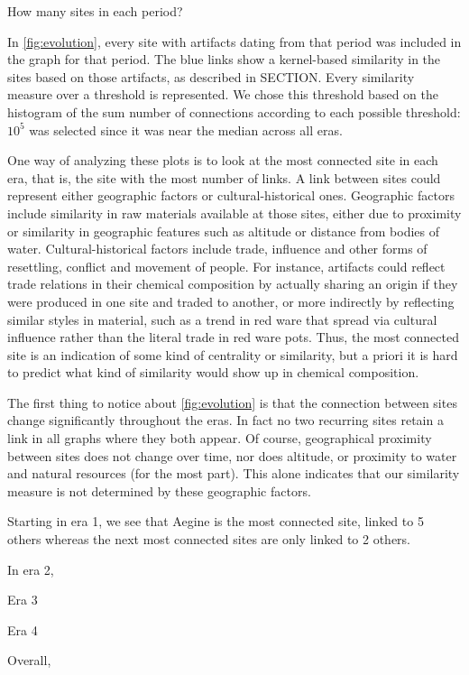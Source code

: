   How many sites in each period?
  
In \cref{fig:evolution}, every site with artifacts dating from that period was included in the graph for that period. The blue links show a kernel-based similarity in the sites based on those artifacts, as described in SECTION. Every similarity measure over a threshold is represented. We chose this threshold based on the histogram of the sum number of connections according to each possible threshold: $10^{5}$ was selected since it was near the median across all eras.

One way of analyzing these plots is to look at the most connected site in each era, that is, the site with the most number of links. A link between sites could represent either geographic factors or cultural-historical ones. Geographic factors include similarity in raw materials available at those sites, either due to proximity or similarity in geographic features such as altitude or distance from bodies of water. Cultural-historical factors include trade, influence and other forms of resettling, conflict and movement of people. For instance, artifacts could reflect trade relations in their chemical composition by actually sharing an origin if they were produced in one site and traded to another, or more indirectly by reflecting similar styles in material, such as a trend in red ware that spread via cultural influence rather than the literal trade in red ware pots.  Thus, the most connected site is an indication of some kind of centrality or similarity, but a priori it is hard to predict what kind of similarity would show up in chemical composition.

The first thing to notice about \cref{fig:evolution} is that the connection between sites change significantly throughout the eras. In fact no two recurring sites retain a link in all graphs where they both appear. Of course, geographical proximity between sites does not change over time, nor does altitude, or proximity to water and natural resources (for the most part). This alone indicates that our similarity measure is not determined by these geographic factors. 

Starting in era 1, we see that Aegine is the most connected site, linked to 5 others whereas the next most connected sites are only linked to 2 others. 

In era 2, 

Era 3

Era 4

Overall, 

 
  
